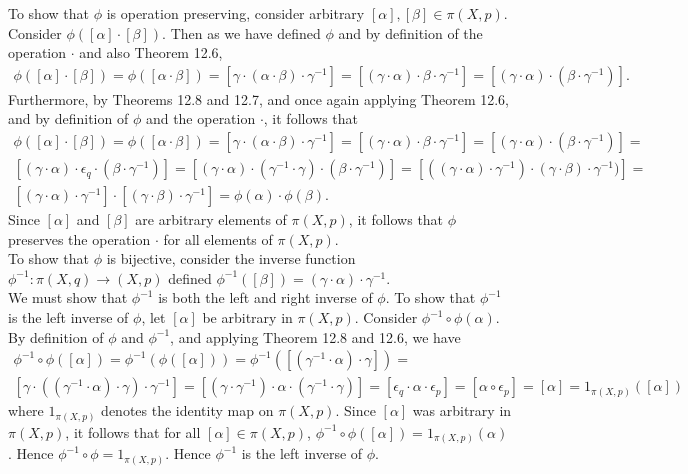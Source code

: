 \documentclass{article}
\newcommand{\inv}[1]{#1^{-1}}
\newcommand{\inv}[1]{#1^{-1}}
\begin{document}
To show that $\phi$ is operation preserving, consider arbitrary $[\alpha],[\beta]\in\pi(X,p)$. Consider $\phi([\alpha]\cdot[\beta]).$ Then as we have defined $\phi$ and by definition of the operation $\cdot$ and also Theorem 12.6, 
\begin{multline*}
    \phi([\alpha]\cdot[\beta]) = \phi([\alpha\cdot \beta]) =  [\gamma\cdot(\alpha\cdot\beta)\cdot\inv{\gamma}] = [(\gamma\cdot\alpha)\cdot\beta\cdot \inv{\gamma}] = [(\gamma\cdot\alpha)\cdot(\beta\cdot \inv{\gamma})].
\end{multline*}
Furthermore, by Theorems 12.8 and 12.7, and once again applying Theorem 12.6, and by definition of $\phi$ and the operation $\cdot$, it follows that 
\begin{multline*}
    \phi([\alpha]\cdot[\beta]) = \phi([\alpha\cdot \beta]) =  [\gamma\cdot(\alpha\cdot\beta)\cdot\inv{\gamma}] = [(\gamma\cdot\alpha)\cdot\beta\cdot \inv{\gamma}] = [(\gamma\cdot\alpha)\cdot(\beta\cdot \inv{\gamma})]= \\
    [(\gamma\cdot\alpha)\cdot\epsilon_{q}\cdot(\beta\cdot \inv{\gamma})]=
    [(\gamma\cdot\alpha)\cdot(\inv{\gamma}\cdot \gamma)\cdot(\beta\cdot \inv{\gamma})]=[((\gamma\cdot\alpha)\cdot\inv{\gamma})\cdot( \gamma\cdot\beta)\cdot \inv{\gamma})] =\\ [(\gamma\cdot\alpha)\cdot\inv{\gamma}]\cdot[( \gamma\cdot\beta)\cdot \inv{\gamma}] = \phi(\alpha)\cdot\phi(\beta).
\end{multline*}
Since $[\alpha]$ and $[\beta]$ are arbitrary elements of $\pi(X,p)$, it follows that $\phi$ preserves the operation $\cdot$ for all elements of $\pi(X,p)$.
\\

To show that $\phi$ is bijective, consider the inverse function $\inv{\phi}:\pi(X,q)\rightarrow (X,p)$ defined $\inv{\phi}([\beta]) = (\gamma\cdot\alpha)\cdot\inv{\gamma}$. \\

We must show that $\inv{\phi}$ is both the left and right inverse of $\phi$. To show that $\inv{\phi}$ is the left inverse of $\phi$, let $[\alpha]$ be arbitrary in $\pi(X,p)$. Consider $\inv{\phi}\circ\phi(\alpha)$. By definition of $\phi$ and $\inv{\phi}$, and applying Theorem 12.8 and 12.6, we have 
\begin{multline*}
    \inv{\phi}\circ\phi([\alpha]) = \inv{\phi}(\phi([\alpha])) = \inv{\phi}([(\inv{\gamma}\cdot\alpha)\cdot \gamma]) =\\ [\gamma\cdot((\inv{\gamma}\cdot\alpha)\cdot \gamma)\cdot\inv{\gamma}] = [(\gamma\cdot\inv{\gamma})\cdot \alpha \cdot (\inv{\gamma}\cdot \gamma)] = [\epsilon_q\cdot \alpha\cdot \epsilon_p] = [\alpha\circ \epsilon_p] = [\alpha] = 1_{\pi(X,p)}([\alpha])
\end{multline*}
where $1_{\pi(X,p)}$ denotes the identity map on $\pi(X,p)$. Since $[\alpha]$ was arbitrary in $\pi(X,p)$, it follows that for all $[\alpha]\in \pi(X,p)$, $\inv{\phi}\circ \phi([\alpha]) = 1_{\pi(X,p)}(\alpha)$. Hence $\inv{\phi}\circ \phi = 1_{\pi(X,p)}$. Hence $\inv{\phi}$ is the left inverse of $\phi$.\\
\end{document}
